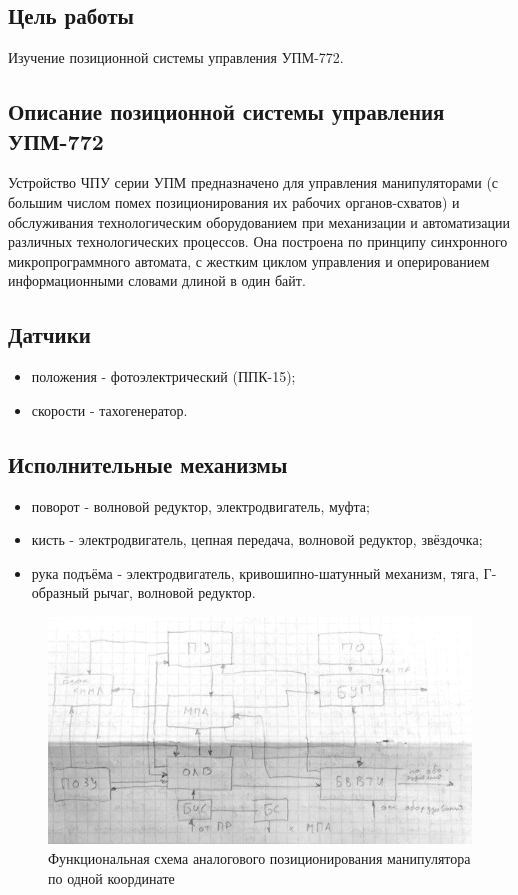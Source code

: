 \subsection*{Цель работы}

Изучение позиционной системы управления УПМ-772.

\subsection*{Описание позиционной системы управления УПМ-772}

Устройство ЧПУ серии УПМ предназначено для управления манипуляторами (с большим числом помех позиционирования их рабочих органов-схватов) и обслуживания технологическим оборудованием при механизации и автоматизации различных технологических процессов. Она построена по принципу синхронного микропрограммного автомата, с жестким циклом управления и оперированием информационными словами длиной в один байт.

\subsection*{Датчики}

\begin{itemize}
    \item положения - фотоэлектрический (ППК-15);
    \item скорости - тахогенератор.
\end{itemize}

\subsection*{Исполнительные механизмы}

\begin{itemize}
    \item поворот - волновой редуктор, электродвигатель, муфта;
    \item кисть - электродвигатель, цепная передача, волновой редуктор, звёздочка;
    \item рука подъёма - электродвигатель, кривошипно-шатунный механизм, тяга, Г-образный рычаг, волновой редуктор.
\end{itemize}

\begin{figure}[ht]
    \includegraphics[width=1\linewidth]{Figures/block.png}
    \caption{Функциональная схема аналогового позиционирования манипулятора по одной координате}
    \label{fig:block}
\end{figure}

